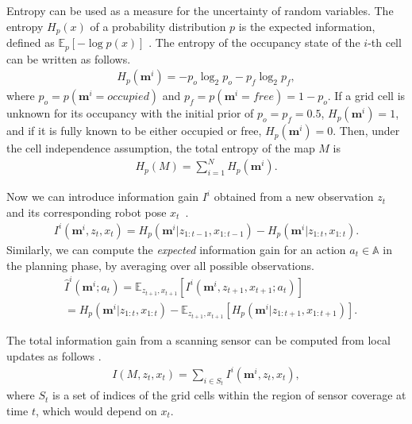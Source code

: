 \documentclass[letterpaper, 10 pt, conference]{ieeeconf}  %
\begin{document}
Entropy can be used as a measure for the uncertainty of random variables.
The entropy $H_p(x)$ of a probability distribution $p$ is the expected information, defined as $\mathbb{E}_p[-\log p(x)]$ \cite{cover2012elements}.
The entropy of the occupancy state of the $i$-th cell can be written as follows.
\begin{align}
  H_p(\mathbf{m}^i) = -p_o \log_2 p_{o} - p_f \log_2 p_f,
\end{align}
where $p_o = p(\mathbf{m}^i = occupied)$ and $p_f = p(\mathbf{m}^i = free) = 1 - p_o$.
If a grid cell is unknown for its occupancy with the initial prior of $p_o = p_f = 0.5$, $H_p(\mathbf{m}^i) = 1$, and if it is fully known to be either occupied or free, $H_{p}(\mathbf{m}^i) = 0$.
%
Then, under the cell independence assumption, the total entropy of the map $M$ is
\begin{align}
  H_p(M) = \textstyle \sum_{i = 1}^N H_{p}(\mathbf{m}^i).
\end{align}

Now we can introduce information gain $I^i$ obtained from a new observation $z_t$ and its corresponding robot pose $x_t$~\cite{cover2012elements}.
\begin{align}
  I^i(\mathbf{m}^i, z_t, x_t) = H_p(\mathbf{m}^i | z_{1:t-1}, x_{1:t-1}) - H_p(\mathbf{m}^i | z_{1:t}, x_{1:t}).
\end{align}
Similarly, we can compute the \textit{expected} information gain for an action $a_t \in \mathbb{A}$ in the planning phase, by averaging over all possible observations.
\begin{align}
  &\hat{I}^i(\mathbf{m}^i; a_t)
  = \mathbb{E}_{z_{t+1}, x_{t+1}} [ I^i (\mathbf{m}^i, z_{t+1}, x_{t+1}; a_t) ] \nonumber \\
  &\!\!= H_p(\mathbf{m}^i | z_{1:t}, x_{1:t}) - \mathbb{E}_{z_{t+1}, x_{t+1}} [ H_p (\mathbf{m}^i | z_{1:t+1}, x_{1:t+1}) ].
\end{align}

The total information gain from a scanning sensor can be computed from local updates as follows
\cite{bourgault2002information}.
\begin{align}
  I(M, z_t, x_t) = \sum_{i \in S_t} I^i(\mathbf{m}^i, z_t, x_t),
  \label{eq:infogain}
\end{align}
where $S_t$ is a set of indices of the grid cells within the region of sensor coverage at time $t$, which would depend on $x_t$.



\end{document}
